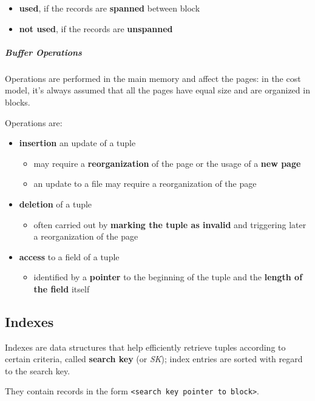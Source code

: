 \documentclass[english]{article}
\begin{document}
\begin{itemize}
  \item \textbf{used}, if the records are \textbf{spanned} between block
  \item \textbf{not used}, if the records are \textbf{unspanned}
\end{itemize}

\subparagraph*{Buffer Operations}

Operations are performed in the main memory and affect the pages: in the cost model, it's always assumed that all the pages have equal size and are organized in blocks.

Operations are:

\begin{itemize}
  \item \textbf{insertion} an update of a tuple
        \begin{itemize}
          \item may require a \textbf{reorganization} of the page or the usage of a \textbf{new page}
          \item an update to a file may require a reorganization of the page
        \end{itemize}
  \item \textbf{deletion} of a tuple
        \begin{itemize}
          \item often carried out by \textbf{marking the tuple as invalid} and triggering later a reorganization of the page
        \end{itemize}
  \item \textbf{access} to a field of a tuple
        \begin{itemize}
          \item identified by a \textbf{pointer} to the beginning of the tuple and the \textbf{length of the field} itself
        \end{itemize}
\end{itemize}

\subsection{Indexes}

Indexes are data structures that help efficiently retrieve tuples according to certain criteria, called \textbf{search key} (or \textit{SK}); index entries are sorted with regard to the search key.

They contain records in the form \texttt{<search key pointer to block>}.
\end{document}
